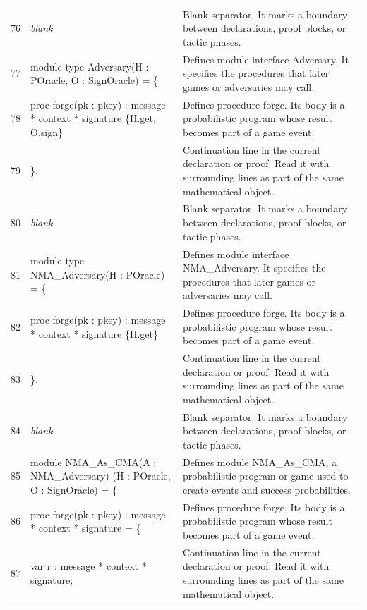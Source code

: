 \documentclass[10pt]{article}
\begin{document}
\begin{longtable}{r L{0.53\textwidth} L{0.37\textwidth}}
76 & {\ttfamily\scriptsize \emph{blank}} & Blank separator.  It marks a boundary between declarations, proof blocks, or tactic phases. \\
77 & {\ttfamily\scriptsize module type Adversary(H : POracle, O : SignOracle) = \{} & Defines module interface Adversary.  It specifies the procedures that later games or adversaries may call. \\
78 & {\ttfamily\scriptsize   proc forge(pk : pkey) : message * context * signature \{H.get, O.sign\}} & Defines procedure forge.  Its body is a probabilistic program whose result becomes part of a game event. \\
79 & {\ttfamily\scriptsize \}.} & Continuation line in the current declaration or proof.  Read it with surrounding lines as part of the same mathematical object. \\
80 & {\ttfamily\scriptsize \emph{blank}} & Blank separator.  It marks a boundary between declarations, proof blocks, or tactic phases. \\
81 & {\ttfamily\scriptsize module type NMA\_Adversary(H : POracle) = \{} & Defines module interface NMA\_Adversary.  It specifies the procedures that later games or adversaries may call. \\
82 & {\ttfamily\scriptsize   proc forge(pk : pkey) : message * context * signature \{H.get\}} & Defines procedure forge.  Its body is a probabilistic program whose result becomes part of a game event. \\
83 & {\ttfamily\scriptsize \}.} & Continuation line in the current declaration or proof.  Read it with surrounding lines as part of the same mathematical object. \\
84 & {\ttfamily\scriptsize \emph{blank}} & Blank separator.  It marks a boundary between declarations, proof blocks, or tactic phases. \\
85 & {\ttfamily\scriptsize module NMA\_As\_CMA(A : NMA\_Adversary) (H : POracle, O : SignOracle) = \{} & Defines module NMA\_As\_CMA, a probabilistic program or game used to create events and success probabilities. \\
86 & {\ttfamily\scriptsize   proc forge(pk : pkey) : message * context * signature = \{} & Defines procedure forge.  Its body is a probabilistic program whose result becomes part of a game event. \\
87 & {\ttfamily\scriptsize     var r : message * context * signature;} & Continuation line in the current declaration or proof.  Read it with surrounding lines as part of the same mathematical object. \\

\end{longtable}
\end{document}
